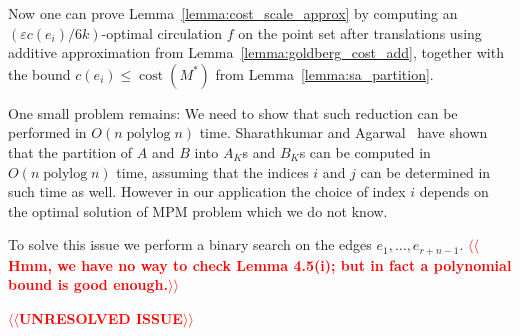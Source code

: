 \documentclass[11pt]{article}
\makeatletter
\def\polylog{\mathop{\mathrm{polylog}}}
\def\eps{\varepsilon}
\def\cost{\operatorname{cost}}
\theoremstyle{plain}
\numberwithin{figure}{section}
\def\n@te#1{\textsf{\boldmath \textbf{$\langle\!\langle$#1$\rangle\!\rangle$}}\leavevmode}
\def\note#1{\textcolor{red}{\n@te{#1}}}
\makeatother
\begin{document}
Now one can prove Lemma~\ref{lemma:cost_scale_approx} by computing an $(\eps c(e_i)/6k)$-optimal
circulation $f$ on the point set after translations using additive approximation from Lemma~\ref{lemma:goldberg_cost_add}, together with the bound $c(e_i) \leq \cost(M^*)$ from
Lemma~\ref{lemma:sa_partition}.


One small problem remains: We need to show that such reduction can be performed in $O(n\polylog n)$ time.
Sharathkumar and Agarwal~\cite{SA12} have shown that the partition of $A$ and $B$ into $A_K$s and $B_K$s can be computed in $O(n \polylog n)$ time, assuming that the indices $i$ and $j$ can be determined in such time as well.  However in our application the choice of index $i$ depends on the optimal solution of MPM problem which we do not know.

To solve this issue we perform a binary search on the edges $e_1, \ldots, e_{r+n-1}$.  \note{Hmm, we have no way to check Lemma 4.5(i); but in fact a polynomial bound is good enough.}

\note{UNRESOLVED ISSUE}


%
\end{document}
